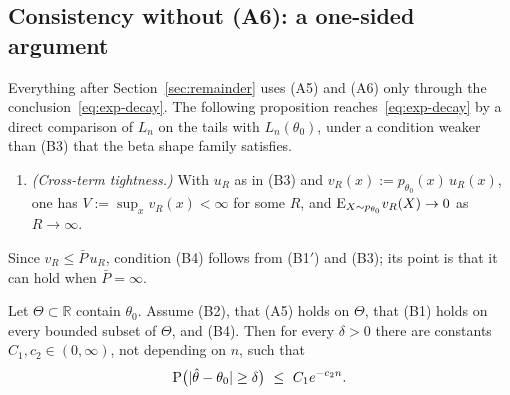\subsection*{Consistency without (A6): a one-sided argument}

Everything after Section~\ref{sec:remainder} uses (A5) and (A6) only through the conclusion~\eqref{eq:exp-decay}. The following proposition reaches~\eqref{eq:exp-decay} by a direct comparison of $L_n$ on the tails with $L_n(\theta_0)$, under a condition weaker than (B3) that the beta shape family satisfies.

\begin{enumerate}
	\item[(B4)] \emph{(Cross-term tightness.)} With $u_R$ as in (B3) and $v_R(x):=p_{\theta_0}(x)\,u_R(x)$, one has $V:=\sup_{x}v_R(x)<\infty$ for some $R$, and $\mathrm{E}_{X\sim p_{\theta_0}}v_R(X)\to0$ as $R\to\infty$.
\end{enumerate}

Since $v_R\le\bar P\,u_R$, condition (B4) follows from (B1$'$) and (B3); its point is that it can hold when $\bar P=\infty$.

\begin{prop}
\label{prop:consistency-unbounded}
Let $\Theta\subset\mathbb{R}$ contain $\theta_0$. Assume (B2), that (A5) holds on $\Theta$, that (B1) holds on every bounded subset of $\Theta$, and (B4). Then for every $\delta>0$ there are constants $C_1,c_2\in(0,\infty)$, not depending on $n$, such that
$$
\Prob\big(\abs{\hat\theta-\theta_0}\ge\delta\big)\ \le\ C_1e^{-c_2n}.
$$
\end{prop}

